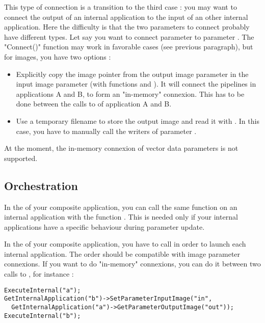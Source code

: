 This type of connection is a transition to the third case : you may want to connect
the output of an internal application to the input of an other internal application.
Here the difficulty is that the two parameters to connect probably have different
types. Let say you want to connect parameter  to parameter .
The "Connect()" function may work in favorable cases (see previous paragraph),
but for images, you have two options :
\begin{itemize}
\item Explicitly copy the image pointer from the output image parameter in the input
image parameter (with functions  and
). It will connect the pipelines in applications
A and B, to form an "in-memory" connexion. This has to be done between the calls
to  of application A and B.
\item Use a temporary filename to store the output image  and read it
with . In this case, you have to manually call the writers of parameter
.
\end{itemize}

At the moment, the in-memory connexion of vector data parameters is not supported.

\subsection{Orchestration}

In the  of your composite application, you can call
the same function on an internal application with the function .
This is needed only if your internal applications have a specific behaviour during
parameter update.

In the  of your composite application, you have to call 
in order to launch each internal application. The order should be compatible with
image parameter connexions. If you want to do "in-memory" connexions, you can do it between
two calls to , for instance :

\small
\begin{lstlisting}
ExecuteInternal("a");
GetInternalApplication("b")->SetParameterInputImage("in",
  GetInternalApplication("a")->GetParameterOutputImage("out"));
ExecuteInternal("b");
\end{lstlisting}
\normalsize

